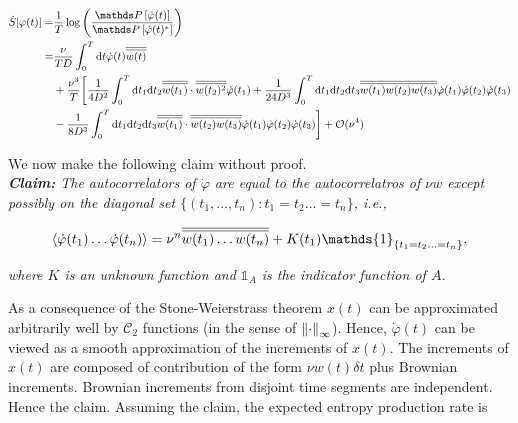 \begin{equation}\small\label{onepath}
\begin{split}
 \dot{S}[\varphi(t)] = & \frac{1}{T}\log\left(\frac{\bP\left[\dot{\varphi}(t)\right]}{\bP\left[\dot{\varphi}(t)^\ast\right]}\right) \\= & \frac{\nu}{TD}\int_0^T\rmd t\dot{\varphi}(t)\Overline{w(t)} \\
 &+ \frac{\nu^3}{T} \bigg[\frac{1}{4D^2} \int_0^T \rmd t_1 \rmd t_2 \Overline{w(t_1)}\cdot\Overline{w(t_2)^2}\dot{\varphi}(t_1) + \frac{1}{24D^3}\int_0^T \rmd t_1 \rmd t_2 \rmd t_3 \Overline{w(t_1)w(t_2)w(t_3)}\dot{\varphi}(t_1)\dot{\varphi}(t_2)\dot{\varphi}(t_3)\\
  &- \frac{1}{8D^3}\int_0^T \rmd t_1 \rmd t_2 \rmd t_3 \Overline{w(t_1)}\cdot \Overline{w(t_2)w(t_3)}\dot{\varphi}(t_1)\dot{\varphi}(t_2)\dot{\varphi}(t_3)\bigg] + \mathcal{O}(\nu^4)
\end{split}
\end{equation}

We now make the following claim without proof. \\

\textit{\textbf{Claim:}
The autocorrelators of $\dot{\varphi}$ are equal to the autocorrelatros of $\nu w$ except possibly on the diagonal set $\{(t_1,\ldots,t_n): t_1 = t_2 \ldots = t_n\}$, i.e.,}

\begin{align}
\langle \dot{\varphi}(t_1)\ldots\dot{\varphi}(t_n)\rangle = \nu^n\Overline{w(t_1)\ldots w(t_n)} + K(t_1)\mathds{1}_{\{t_1 =t_2 \ldots =t_n\}}.
\end{align}

\textit{where $K$ is an unknown function and $\mathds{1}_A$ is the indicator function of $A$.}

As a consequence of the Stone-Weierstrass theorem $x(t)$ can be approximated arbitrarily well by $\mathcal{C}_2$ functions (in the sense of $\norm{\cdot}_\infty$). Hence, $\dot{\varphi}(t)$ can be viewed as a smooth approximation of the increments of $x(t)$. The increments of $x(t)$ are composed of contribution of the form $\nu w(t)\delta t$ plus Brownian increments. Brownian increments from disjoint time segments are independent. Hence the claim. Assuming the claim, the expected entropy production rate is

